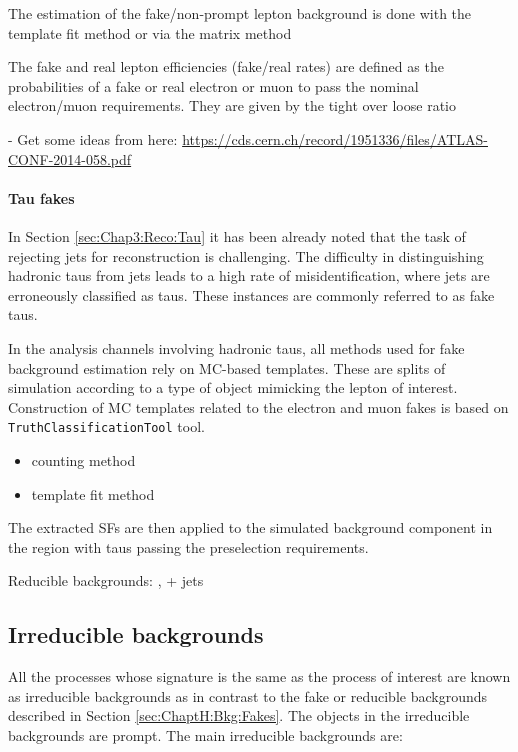 The estimation of the fake/non-prompt lepton background is done with the template fit method or via the matrix method

The fake and real lepton efficiencies (fake/real rates) are defined as the probabilities of a fake or real
electron or muon to pass the nominal electron/muon requirements. They are given by the tight over loose ratio

- Get some ideas from here: \url{https://cds.cern.ch/record/1951336/files/ATLAS-CONF-2014-058.pdf}

\paragraph{Tau fakes}
In Section \ref{sec:Chap3:Reco:Tau} it has been already noted that the task of rejecting 
jets for \tauhad reconstruction is challenging. The difficulty in distinguishing hadronic taus 
from jets leads to a high rate of misidentification, where jets are erroneously classified as 
taus. These instances are commonly referred to as fake taus.


In the analysis channels involving hadronic taus, all methods used for fake background estimation rely
on MC-based templates. These are splits of simulation according to a type of object mimicking the
lepton of interest. Construction of MC templates related to the electron and muon fakes is based on
\texttt{TruthClassificationTool} tool.
\begin{itemize}
	\item counting method
	\item template fit method
\end{itemize}

The extracted SFs are then applied to the simulated background component
in the region with taus passing the preselection requirements.

Reducible backgrounds: \ttbar, \PZ + jets 


\subsection{Irreducible backgrounds}
\label{sec:ChaptH:Bkg:Irreducible}
All the processes whose signature is the same as the process of interest are known as irreducible backgrounds as in
contrast to the fake or reducible backgrounds described in Section \ref{sec:ChaptH:Bkg:Fakes}. The objects in 
the irreducible backgrounds are prompt. The main irreducible backgrounds are:


